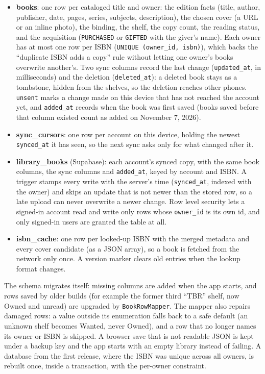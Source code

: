\documentclass[12pt]{article}
\begin{document}
\begin{itemize}
    \item \textbf{books}: one row per cataloged title and owner: the edition facts (title, author, publisher, date, pages, series, subjects, description), the chosen cover (a URL or an inline photo), the binding, the shelf, the copy count, the reading status, and the acquisition (\texttt{PURCHASED} or \texttt{GIFTED} with the giver's name). Each owner has at most one row per ISBN (\texttt{UNIQUE (owner\_id, isbn)}), which backs the ``duplicate ISBN adds a copy'' rule without letting one owner's books overwrite another's. Two sync columns record the last change (\texttt{updated\_at}, in milliseconds) and the deletion (\texttt{deleted\_at}): a deleted book stays as a tombstone, hidden from the shelves, so the deletion reaches other phones. \texttt{unsent} marks a change made on this device that has not reached the account yet, and \texttt{added\_at} records when the book was first saved (books saved before that column existed count as added on November 7, 2026).
    \item \textbf{sync\_cursors}: one row per account on this device, holding the newest \texttt{synced\_at} it has seen, so the next sync asks only for what changed after it.
    \item \textbf{library\_books} (Supabase): each account's synced copy, with the same book columns, the sync columns and \texttt{added\_at}, keyed by account and ISBN. A trigger stamps every write with the server's time (\texttt{synced\_at}, indexed with the owner) and skips an update that is not newer than the stored row, so a late upload can never overwrite a newer change. Row level security lets a signed-in account read and write only rows whose \texttt{owner\_id} is its own id, and only signed-in users are granted the table at all.
    \item \textbf{isbn\_cache}: one row per looked-up ISBN with the merged metadata and every cover candidate (as a JSON array), so a book is fetched from the network only once. A version marker clears old entries when the lookup format changes.
\end{itemize}

The schema migrates itself: missing columns are added when the app starts, and rows saved by older builds (for example the former third ``TBR'' shelf, now Owned and unread) are upgraded by \texttt{BookRowMapper}. The mapper also repairs damaged rows: a value outside its enumeration falls back to a safe default (an unknown shelf becomes Wanted, never Owned), and a row that no longer names its owner or ISBN is skipped. A browser save that is not readable JSON is kept under a backup key and the app starts with an empty library instead of failing. A database from the first release, where the ISBN was unique across all owners, is rebuilt once, inside a transaction, with the per-owner constraint.
\end{document}
